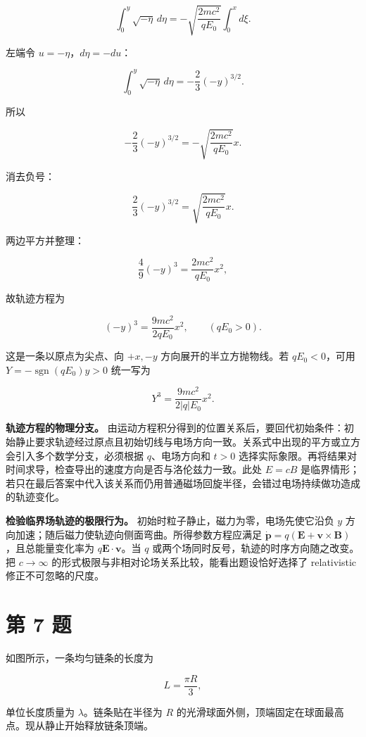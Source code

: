 \documentclass[12pt,a4paper,UTF8]{ctexart}
\begin{document}
\[
\int_0^y\sqrt{-\eta}\,d\eta
=-\sqrt{\frac{2mc^2}{qE_0}}\int_0^x d\xi.
\]

左端令 \(u=-\eta\)，\(d\eta=-du\)：

\[
\int_0^y\sqrt{-\eta}\,d\eta
=-\frac23(-y)^{3/2}.
\]

所以

\[
-\frac23(-y)^{3/2}
=-\sqrt{\frac{2mc^2}{qE_0}}x.
\]

消去负号：

\[
\boxed{
\frac23(-y)^{3/2}
=\sqrt{\frac{2mc^2}{qE_0}}x
}.
\tag{11}
\]

两边平方并整理：

\[
\frac49(-y)^3
=\frac{2mc^2}{qE_0}x^2,
\]

故轨迹方程为

\[
\boxed{
(-y)^3=\frac{9mc^2}{2qE_0}x^2
},
\qquad(qE_0>0).
\tag{12}
\]

这是一条以原点为尖点、向 \(+x,-y\) 方向展开的半立方抛物线。若
\(qE_0<0\)，可用 \(Y=-\operatorname{sgn}(qE_0)y>0\) 统一写为

\[
Y^3=\frac{9mc^2}{2|q|E_0}x^2.
\]

\textbf{轨迹方程的物理分支。}
由运动方程积分得到的位置关系后，要回代初始条件：初始静止要求轨迹经过原点且初始切线与电场方向一致。关系式中出现的平方或立方会引入多个数学分支，必须根据
\(q\)、电场方向和 \(t>0\)
选择实际象限。再将结果对时间求导，检查导出的速度方向是否与洛伦兹力一致。此处
\(E=cB\)
是临界情形；若只在最后答案中代入该关系而仍用普通磁场回旋半径，会错过电场持续做功造成的轨迹变化。

\textbf{检验临界场轨迹的极限行为。}
初始时粒子静止，磁力为零，电场先使它沿负 \(y\)
方向加速；随后磁力使轨迹向侧面弯曲。所得参数方程应满足
\(\dot{\boldsymbol p}=q(\boldsymbol E+\boldsymbol v\times\boldsymbol B)\)，且总能量变化率为
\(q\boldsymbol E\cdot\boldsymbol v\)。当 \(q\)
或两个场同时反号，轨迹的时序方向随之改变。把 \(c\to\infty\)
的形式极限与非相对论场关系比较，能看出题设恰好选择了 relativistic
修正不可忽略的尺度。

\newpage

\section{第 7 题}\label{ux7b2c-7-ux9898}

如图所示，一条均匀链条的长度为

\[
L=\frac{\pi R}{3},
\]

单位长度质量为 \(\lambda\)。链条贴在半径为 \(R\)
的光滑球面外侧，顶端固定在球面最高点。现从静止开始释放链条顶端。
\end{document}

